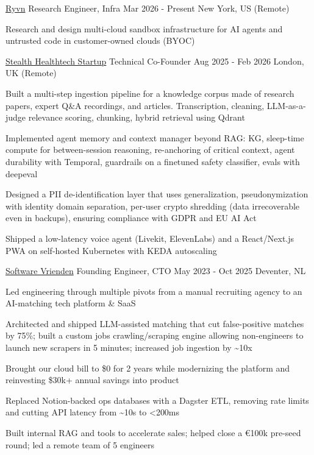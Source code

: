 
\begin{cventries}
  \cventry
    {\href{https://ryvn.ai}{Ryvn}}
    {Research Engineer, Infra}
    {Mar 2026 - Present}
    {New York, US (Remote)}
    {
      \begin{cvitems}
        \item {Research and design multi-cloud sandbox infrastructure for AI agents and untrusted code in customer-owned clouds (BYOC)}
      \end{cvitems}
    }

  \cventry
    {\href{https://en.wikipedia.org/wiki/Stealth_startup}{Stealth Healthtech Startup}}
    {Technical Co-Founder}
    {Aug 2025 - Feb 2026}
    {London, UK (Remote)}
    {
      \begin{cvitems}
        \item {Built a multi-step ingestion pipeline for a knowledge corpus made of research papers, expert Q\&A recordings, and articles. Transcription, cleaning, LLM-as-a-judge relevance scoring, chunking, hybrid retrieval using Qdrant}
        \item {Implemented agent memory and context manager beyond RAG: KG, sleep-time compute for between-session reasoning, re-anchoring of critical context, agent durability with Temporal, guardrails on a finetuned safety classifier, evals with deepeval}
        \item {Designed a PII de-identification layer that uses generalization, pseudonymization with identity domain separation, per-user crypto shredding (data irrecoverable even in backups), ensuring compliance with GDPR and EU AI Act}
        \item {Shipped a low-latency voice agent (Livekit, ElevenLabs) and a React/Next.js PWA on self-hosted Kubernetes with KEDA autoscaling}
      \end{cvitems}
    }

  \cventry
    {\href{https://softwarevrienden.nl}{Software Vrienden}}
    {Founding Engineer, CTO}
    {May 2023 - Oct 2025}
    {Deventer, NL}
    {
      \begin{cvitems}
        \item {Led engineering through multiple pivots from a manual recruiting agency to an AI-matching tech platform \& SaaS}
        \item {Architected and shipped LLM-assisted matching that cut false-positive matches by 75\%; built a custom jobs crawling/scraping engine allowing non-engineers to launch new scrapers in 5 minutes; increased job ingestion by \textasciitilde{}10x}
        \item {Brought our cloud bill to \$0 for 2 years while modernizing the platform and reinvesting \$30k+ annual savings into product}
        \item {Replaced Notion-backed ops databases with a Dagster ETL, removing rate limits and cutting API latency from \textasciitilde{}10s to <200ms}
        \item {Built internal RAG and tools to accelerate sales; helped close a €100k pre-seed round; led a remote team of 5 engineers}
      \end{cvitems}
    }


\end{cventries}
